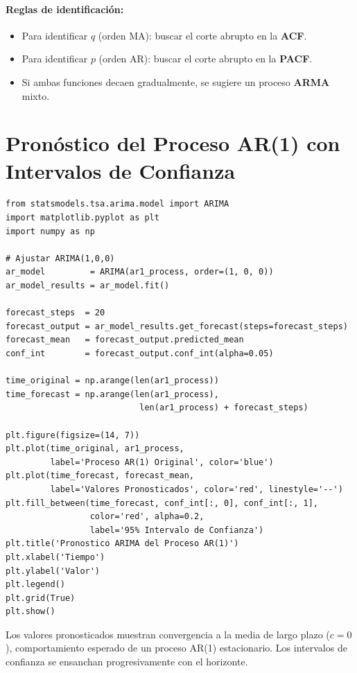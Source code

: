\documentclass[12pt, a4paper]{article}
\begin{document}
\paragraph{Reglas de identificación:}
\begin{itemize}
  \item Para identificar $q$ (orden MA): buscar el corte abrupto en la
        \textbf{ACF}.
  \item Para identificar $p$ (orden AR): buscar el corte abrupto en la
        \textbf{PACF}.
  \item Si ambas funciones decaen gradualmente, se sugiere un proceso
        \textbf{ARMA} mixto.
\end{itemize}

\section{Pronóstico del Proceso AR(1) con Intervalos de Confianza}

\begin{lstlisting}
from statsmodels.tsa.arima.model import ARIMA
import matplotlib.pyplot as plt
import numpy as np

# Ajustar ARIMA(1,0,0)
ar_model         = ARIMA(ar1_process, order=(1, 0, 0))
ar_model_results = ar_model.fit()

forecast_steps  = 20
forecast_output = ar_model_results.get_forecast(steps=forecast_steps)
forecast_mean   = forecast_output.predicted_mean
conf_int        = forecast_output.conf_int(alpha=0.05)

time_original = np.arange(len(ar1_process))
time_forecast = np.arange(len(ar1_process),
                           len(ar1_process) + forecast_steps)

plt.figure(figsize=(14, 7))
plt.plot(time_original, ar1_process,
         label='Proceso AR(1) Original', color='blue')
plt.plot(time_forecast, forecast_mean,
         label='Valores Pronosticados', color='red', linestyle='--')
plt.fill_between(time_forecast, conf_int[:, 0], conf_int[:, 1],
                 color='red', alpha=0.2,
                 label='95% Intervalo de Confianza')
plt.title('Pronostico ARIMA del Proceso AR(1)')
plt.xlabel('Tiempo')
plt.ylabel('Valor')
plt.legend()
plt.grid(True)
plt.show()
\end{lstlisting}

Los valores pronosticados muestran convergencia a la media de largo plazo
($c=0$), comportamiento esperado de un proceso AR(1) estacionario. Los
intervalos de confianza se ensanchan progresivamente con el horizonte.
\end{document}
